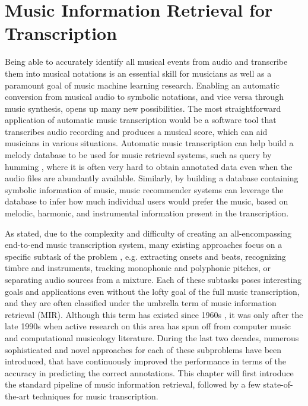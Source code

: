 
\graphicspath{{3-mir/figures/}}

\chapter{Music Information Retrieval for Transcription}
\label{ch:mir}

Being able to accurately identify all musical events from audio and transcribe them into musical notations is an essential skill for musicians as well as a paramount goal of music machine learning research.
Enabling an automatic conversion from musical audio to symbolic notations, and vice versa through music synthesis, opens up many new possibilities.
The most straightforward application of automatic music transcription would be a software tool that transcribes audio recording and produces a musical score, which can aid musicians in various situations.
Automatic music transcription can help build a melody database to be used for music retrieval systems, such as query by humming \cite{molina2014humming}, where it is often very hard to obtain annotated data even when the audio files are abundantly available.
Similarly, by building a database containing symbolic information of music, music recommender systems can leverage the database to infer how much individual users would prefer the music, based on melodic, harmonic, and instrumental information present in the transcription.

As stated, due to the complexity and difficulty of creating an all-encompassing end-to-end music transcription system, many existing approaches focus on a specific subtask of the problem \cite{casey2008mir}, e.g. extracting onsets and beats, recognizing timbre and instruments, tracking monophonic and polyphonic pitches, or separating audio sources from a mixture.
Each of these subtasks poses interesting goals and applications even without the lofty goal of the full music transcription, and they are often classified under the umbrella term of music information retrieval (MIR).
Although this term has existed since 1960s \cite{kassler1966mir}, it was only after the late 1990s when active research on this area has spun off from computer music and computational musicology literature.
During the last two decades, numerous sophisticated and novel approaches for each of these subproblems have been introduced, that have continuously improved the performance in terms of the accuracy in predicting the correct annotations.
This chapter will first introduce the standard pipeline of music information retrieval, followed by a few state-of-the-art techniques for music transcription.

